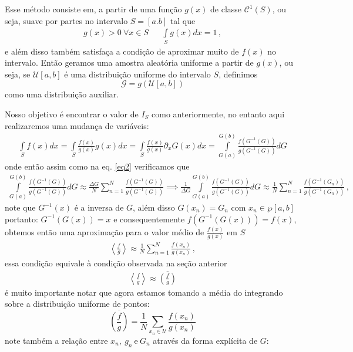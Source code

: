 \documentclass{article}
\begin{document}
Esse método consiste em, a partir de uma função $g(x)$ de classe $\mathcal{C}^1(S)$, ou seja, suave por partes no intervalo $S=[a.b]$ tal que
\begin{align*}
    g(x)>0~\forall x\in S&&\int\limits_{S}g(x)dx=1\,,
\end{align*}
e além disso também satisfaça a condição de aproximar muito de $f(x)$ no intervalo. Então geramos uma amostra aleatória uniforme a partir de $g(x)$, ou seja, se $\mathcal{U}[a,b]$ é uma distribuição uniforme do intervalo $S$, definimos $$\mathcal{G}=g\left(\mathcal{U}[a,b]\right)$$ como uma distribuição auxiliar.

Nosso objetivo é encontrar o valor de $I_S$ como anteriormente, no entanto aqui realizaremos uma mudança de variáveis:
\begin{align}\label{eq13}
    \int\limits_{S}f(x)dx=\int\limits_{S}\frac{f(x)}{g(x)}g(x)dx=\int\limits_{S}\frac{f(x)}{g(x)}\partial_xG(x)dx=\int\limits_{G(a)}^{G(b)}\frac{f\left(G^{-1}(G)\right)}{g\left(G^{-1}(G)\right)}dG
\end{align}
onde então assim como na eq. \ref{eq2} verificamos que
\begin{align*}
    \int\limits_{G(a)}^{G(b)}\frac{f\left(G^{-1}(G)\right)}{g\left(G^{-1}(G)\right)}dG\approx \frac{\Delta G}{N}\sum_{n=1}^{N}\frac{f\left(G^{-1}(G)\right)}{g\left(G^{-1}(G)\right)}\implies \frac{1}{\Delta G}\int\limits_{G(a)}^{G(b)}\frac{f\left(G^{-1}(G)\right)}{g\left(G^{-1}(G)\right)}dG\approx \frac{1}{N}\sum_{n=1}^{N}\frac{f\left(G^{-1}(G_n)\right)}{g\left(G^{-1}(G_n)\right)}\,,
\end{align*}
note que $G^{-1}\left(x\right)$ é a inversa de $G$, além disso $G(x_n)=G_n$ com $x_n\in\wp[a,b]$ portanto: $G^{-1}\left(G(x)\right)=x$ e consequentemente $f(G^{-1}\left(G(x)\right))=f(x)$, obtemos então uma aproximação para o valor médio de $\frac{f(x)}{g(x)}$ em $S$
\begin{align}
    \left<\frac{f}{g}\right>\approx \frac{1}{N}\sum_{n=1}^{N}\frac{f(x_n)}{g(x_n)}\,,
\end{align}
essa condição equivale à condição observada na seção anterior
\begin{align*}
    \left<\frac{f}{g}\right>\approx \overline{\left(\frac{f}{g}\right)}
\end{align*}
é muito importante notar que agora estamos tomando a média do integrando sobre a distribuição uniforme de pontos: $$\overline{\left(\frac{f}{g}\right)}= \frac{1}{N}\sum_{x_n\in\mathcal{U}}\frac{f(x_n)}{g(x_n)}$$ note também a relação entre $x_n,~g_n~$e$~G_n$ através da forma explícita de $G$:
\end{document}
